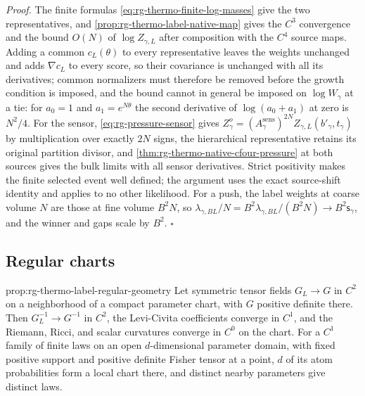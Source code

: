\noindent\emph{Proof.}
The finite formulas \cref{eq:rg-thermo-finite-log-masses} give the two
representatives, and \cref{prop:rg-thermo-label-native-map} gives the $C^3$
convergence and the bound $O(N)$ of $\log Z_{\gamma,L}$ after composition
with the $C^4$ source maps. Adding a common $c_L(\theta)$ to every
representative leaves the weights unchanged and adds $\nabla c_L$ to every
score, so their covariance is unchanged with all its derivatives; common
normalizers must therefore be removed before the growth condition is imposed,
and the bound cannot in general be imposed on $\log W_\gamma$ at a tie: for
$a_0=1$ and $a_1=e^{N\theta}$ the second derivative of $\log(a_0+a_1)$ at zero
is $N^2/4$. For the sensor, \cref{eq:rg-pressure-sensor} gives
$Z^o_{\gamma}=(A_\gamma^{\mathrm{sens}})^{2N}Z_{\gamma,L}(b'_\gamma,t_\gamma)$
by multiplication over exactly $2N$ signs, the hierarchical representative
retains its original partition divisor, and
\cref{thm:rg-thermo-native-cfour-pressure} at both sources gives the bulk
limits with all sensor derivatives. Strict positivity makes the finite
selected event well defined; the argument uses the exact source-shift identity
and applies to no other likelihood. For a push, the label weights at coarse
volume $N$ are those at fine volume $B^2N$, so
$\lambda_{\gamma,BL}/N=B^2\lambda_{\gamma,BL}/(B^2N)\to B^2\mathsf s_\gamma$,
and the winner and gaps scale by $B^2$. $\square$

\subsection{Regular charts}
\label{sec:rg-thermo-label-strict}

{prop:rg-thermo-label-regular-geometry}
Let symmetric tensor fields $G_L\to G$ in $C^2$ on a neighborhood of a
compact parameter chart, with $G$ positive definite there. Then
$G_L^{-1}\to G^{-1}$ in $C^2$, the Levi-Civita coefficients converge in $C^1$,
and the Riemann, Ricci, and scalar curvatures converge in $C^0$ on the chart.
For a $C^1$ family of finite laws on an open $d$-dimensional parameter domain,
with fixed positive support and positive definite Fisher tensor at a point,
$d$ of its atom probabilities form a local chart there, and distinct nearby
parameters give distinct laws. 

